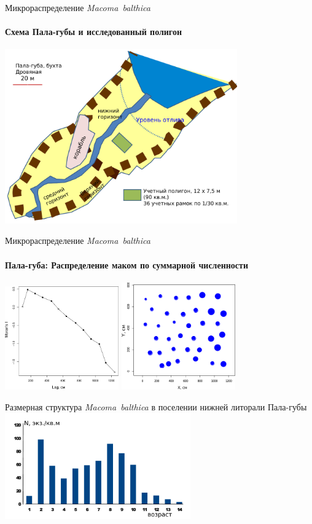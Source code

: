 \documentclass{beamer}
\begin{document}
\begin{frame}{Микрораспределение {\it Macoma~balthica}}
\framesubtitle{Схема Пала-губы и исследованный полигон}
\includegraphics[width=100mm]{./Pala_shema_midist.pdf}
\end{frame}

\begin{frame}{Микрораспределение {\it Macoma~balthica}}
\framesubtitle{Пала-губа: Распределение маком по суммарной численности}
\begin{center}
\includegraphics[width=49mm]{./microdistribution/Pala_moran_N_Macoma_balthica_.pdf}
\includegraphics[width=49mm]{./microdistribution/Pala_N_Macoma_bubbles.pdf}
\end{center}
\end{frame}

\begin{frame}{Размерная структура {\it Macoma~balthica} в поселении нижней литорали Пала-губы}
\includegraphics[width=80mm]{./microdistribution/Pala07_autumn_sizestr.pdf}
\end{frame}
\end{document}
